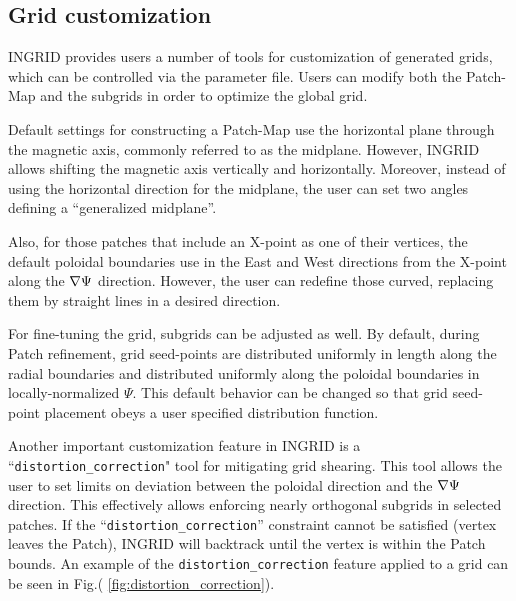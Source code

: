 \subsection{Grid customization}

INGRID provides users a number of tools for customization of generated
grids, which can be controlled via the parameter file. Users can
modify both the Patch-Map and the subgrids in order to optimize the
global grid.

Default settings for constructing a Patch-Map use the horizontal plane
through the magnetic axis, commonly referred to as the midplane.
However, INGRID allows shifting the magnetic axis vertically and
horizontally. Moreover, instead of using the horizontal direction for
the midplane, the user can set two angles defining a ``generalized
midplane''.

Also, for those patches that include an X-point as one of their
vertices, the default poloidal boundaries use in the East and West
directions from the X-point along the $\nabla \Psi$ direction. However,
the user can redefine those curved, replacing them by straight lines
in a desired direction.

For fine-tuning the grid, subgrids can be adjusted as well. By
default, during Patch refinement, grid seed-points are distributed
uniformly in length along the radial boundaries and
distributed uniformly along the poloidal boundaries in
locally-normalized $\Psi$. This default behavior can be changed so
that grid seed-point placement obeys a user specified distribution
function.

Another important customization feature in INGRID is a
``\texttt{distortion\_correction}" tool for mitigating grid
shearing. This tool allows the user to set limits on deviation between
the poloidal direction and the $\nabla \Psi$ direction. This
effectively allows enforcing nearly orthogonal subgrids in selected
patches. If the ``\texttt{distortion\_correction}'' constraint cannot
be satisfied (vertex leaves the Patch), INGRID will backtrack until
the vertex is within the Patch bounds. An example of the
\texttt{distortion\_correction} feature applied to a grid can be seen
in Fig.( \ref{fig:distortion_correction}).

